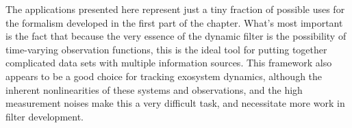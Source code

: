 \bigskip
\bigskip

The applications presented here represent just a tiny fraction of possible uses for the formalism developed in the first part of the chapter.  What's most important is the fact that because the very essence of the dynamic filter is the possibility of time-varying observation functions, this is the ideal tool for putting together complicated data sets with multiple information sources.  This framework also appears to be a good choice for tracking exosystem dynamics, although the inherent nonlinearities of these systems and observations, and the high measurement noises make this a very difficult task, and necessitate more work in filter development.